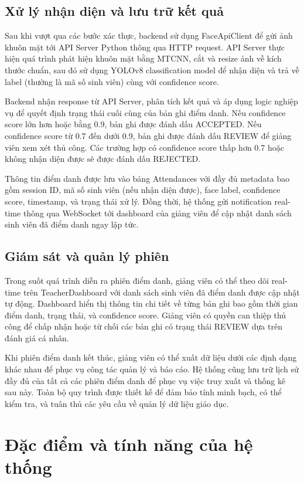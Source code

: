 \documentclass[12pt,a4paper]{report}
\begin{document}
\subsection{Xử lý nhận diện và lưu trữ kết quả}
Sau khi vượt qua các bước xác thực, backend sử dụng FaceApiClient để gửi ảnh khuôn mặt tới API Server Python thông qua HTTP request. API Server thực hiện quá trình phát hiện khuôn mặt bằng MTCNN, cắt và resize ảnh về kích thước chuẩn, sau đó sử dụng YOLOv8 classification model để nhận diện và trả về label (thường là mã số sinh viên) cùng với confidence score.

Backend nhận response từ API Server, phân tích kết quả và áp dụng logic nghiệp vụ để quyết định trạng thái cuối cùng của bản ghi điểm danh. Nếu confidence score lớn hơn hoặc bằng 0.9, bản ghi được đánh dấu ACCEPTED. Nếu confidence score từ 0.7 đến dưới 0.9, bản ghi được đánh dấu REVIEW để giảng viên xem xét thủ công. Các trường hợp có confidence score thấp hơn 0.7 hoặc không nhận diện được sẽ được đánh dấu REJECTED.

Thông tin điểm danh được lưu vào bảng Attendances với đầy đủ metadata bao gồm session ID, mã số sinh viên (nếu nhận diện được), face label, confidence score, timestamp, và trạng thái xử lý. Đồng thời, hệ thống gửi notification real-time thông qua WebSocket tới dashboard của giảng viên để cập nhật danh sách sinh viên đã điểm danh ngay lập tức.

\subsection{Giám sát và quản lý phiên}
Trong suốt quá trình diễn ra phiên điểm danh, giảng viên có thể theo dõi real-time trên TeacherDashboard với danh sách sinh viên đã điểm danh được cập nhật tự động. Dashboard hiển thị thông tin chi tiết về từng bản ghi bao gồm thời gian điểm danh, trạng thái, và confidence score. Giảng viên có quyền can thiệp thủ công để chấp nhận hoặc từ chối các bản ghi có trạng thái REVIEW dựa trên đánh giá cá nhân.

Khi phiên điểm danh kết thúc, giảng viên có thể xuất dữ liệu dưới các định dạng khác nhau để phục vụ công tác quản lý và báo cáo. Hệ thống cũng lưu trữ lịch sử đầy đủ của tất cả các phiên điểm danh để phục vụ việc truy xuất và thống kê sau này. Toàn bộ quy trình được thiết kế để đảm bảo tính minh bạch, có thể kiểm tra, và tuân thủ các yêu cầu về quản lý dữ liệu giáo dục.

\section{Đặc điểm và tính năng của hệ thống}
\end{document}

